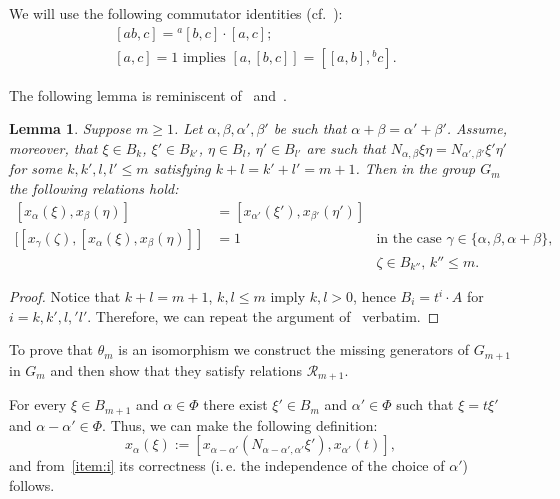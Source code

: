\documentclass[oneside, 10pt]{amsart}
\newcommand{\RR}[1]{\mathcal{R}_{#1}}
\numberwithin{equation}{section}
\newtheorem{lemma}{Lemma}
\numberwithin{lemma}{section}
\theoremstyle{definition}
\theoremstyle{remark}
\begin{document}
We will use the following commutator identities (cf.~\cite[H1]{Re75}):
\begin{align}
 \label{eq:H1ii}  [ab, c] = {}^a[b, c] \cdot [a,c];&\\ %
 \label{eq:H1iii} [a,c]   = 1    \text{ implies } [a, [b,c]] = [[a,b],{}^bc].&
\end{align}

The following lemma is reminiscent of~\cite[Proposition 1.1]{Re75} and~\cite[Proposition~3.2.2]{RS76}.
\begin{lemma}
 Suppose $m \geq 1$.
 Let $\alpha, \beta, \alpha', \beta'$ be such that $\alpha + \beta = \alpha' + \beta'$.
 Assume, moreover, that $\xi \in B_k$, $\xi' \in B_{k'}$, $\eta \in B_l$, $\eta' \in B_{l'}$ are such that 
  $N_{\alpha, \beta} \xi \eta = N_{\alpha', \beta'}\xi' \eta'$ for some $k,k',l,l'\leq m$ satisfying $k+l=k'+l' = m+1$.
 Then in the group $G_m$ the following relations hold:
 \begin{align}
  \label{item:i} [x_\alpha(\xi), x_\beta(\eta)] &= [x_{\alpha'}(\xi'), x_{\beta'}(\eta')] & \\
  \label{item:ii} [[x_\gamma(\zeta), [x_\alpha(\xi), x_\beta(\eta)]] & = 1 & \text{in the case } \gamma\in\{\alpha, \beta, \alpha + \beta\},\\
  \nonumber                                     &                          & \text{$\zeta \in B_{k''}$, $k''\leq m$.}
 \end{align}
\end{lemma}
\begin{proof}
 Notice that $k+l = m+1$, $k, l\leq m$ imply $k,l>0$, hence $B_i= t^i \cdot A$ for $i=k,k',l,'l'$.
 Therefore, we can repeat the argument of~\cite[Proposition 1.1]{Re75} verbatim.
\end{proof}

To prove that $\theta_m$ is an isomorphism we construct the missing generators of $G_{m+1}$ in $G_m$ and then show that they satisfy relations $\RR{m+1}$.

For every $\xi \in B_{m+1}$ and $\alpha\in \Phi$ there exist $\xi' \in B_m$ and $\alpha'\in \Phi$ such that $\xi = t\xi'$ and $\alpha-\alpha'\in\Phi$.
Thus, we can make the following definition:
\begin{equation} \label{eq:defmpn} x_\alpha(\xi) := [x_{\alpha-\alpha'}(N_{\alpha-\alpha',\alpha'} \xi'), x_{\alpha'}(t)],\end{equation} 
and from~\eqref{item:i} its correctness (i.\,e. the independence of the choice of $\alpha'$) follows.
\end{document}

